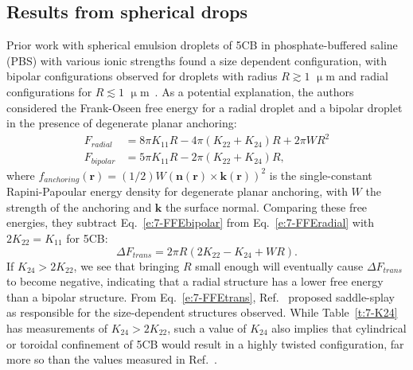 \subsection{Results from spherical drops}
Prior work with spherical emulsion droplets of 5CB in phosphate-buffered saline (PBS) with various ionic strengths found a size dependent configuration, with bipolar configurations observed for droplets with radius $R \gtrsim 1$ $\upmu$m and radial configurations for $R \lesssim 1$ $\upmu$m~\cite{miller2013influence}.
As a potential explanation, the authors considered the Frank-Oseen free energy for a radial droplet and a bipolar droplet in the presence of degenerate planar anchoring:
\begin{align}
  F_{radial} &= 8 \pi K_{11} R - 4 \pi (K_{22} + K_{24}) R + 2 \pi W R^2\label{e:7-FFEradial} \\
  F_{bipolar} &= 5 \pi K_{11} R - 2 \pi (K_{22}+ K_{24}) R,\label{e:7-FFEbipolar}
\end{align}
where $f_{anchoring}(\mathbf{r}) = (1/2) W (\mathbf{n}(\mathbf{r}) \times \mathbf{k}(\mathbf{r}))^2$ is the single-constant Rapini-Papoular energy density for degenerate planar anchoring, with $W$ the strength of the anchoring and $\mathbf{k}$ the surface normal.
Comparing these free energies, they subtract Eq.~\ref{e:7-FFEbipolar} from Eq.~\ref{e:7-FFEradial} with $2 K_{22} = K_{11}$ for 5CB:
\begin{equation}
  \Delta F_{trans} = 2\pi R (2 K_{22}-K_{24} + W R).\label{e:7-FFEtrans}
\end{equation}
If $K_{24} > 2 K_{22}$, we see that bringing $R$ small enough will eventually cause $\Delta F_{trans}$ to become negative, indicating that a radial structure has a lower free energy than a bipolar structure.
From Eq.~\ref{e:7-FFEtrans}, Ref.~\cite{miller2013influence} proposed saddle-splay as responsible for the size-dependent structures observed.
While Table~\ref{t:7-K24} has measurements of $K_{24} > 2 K_{22}$, such a value of $K_{24}$ also implies that cylindrical or toroidal confinement of 5CB would result in a highly twisted configuration, far more so than the values measured in Ref.~\cite{RN24}.

